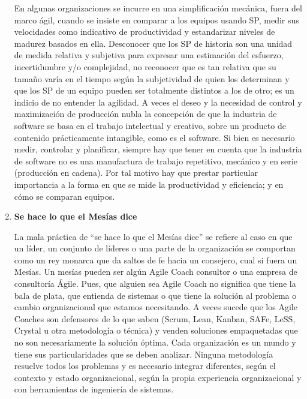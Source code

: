 \begin{enumerate}
En algunas organizaciones se incurre en una simplificación mecánica, fuera del marco ágil, cuando se insiste en comparar a los equipos usando SP, medir sus velocidades como indicativo de productividad y estandarizar niveles de madurez basados en ella. 
Desconocer que los SP de historia son una unidad de medida relativa y subjetiva para expresar una estimación del esfuerzo, incertidumbre y/o complejidad, no reconocer que es tan relativa que su tamaño varía en el tiempo según la subjetividad de quien los determinan y que los SP de un equipo pueden ser totalmente distintos a los de otro; es un indicio de no entender la agilidad. A veces el deseo y la necesidad de control y maximización de producción nubla la concepción de que la industria de software se basa en el trabajo intelectual y creativo, sobre un producto de contenido prácticamente intangible, como es el software. Si bien es necesario medir, controlar y planificar, siempre hay que tener en cuenta que la industria de software no es una manufactura de trabajo repetitivo, mecánico y en serie (producción en cadena). Por tal motivo hay que prestar particular importancia a la forma en que se mide la productividad y eficiencia; y en cómo se comparan equipos.

\item \textbf{Se hace lo que el Mesías dice}

La mala práctica de “se hace lo que el Mesías dice” se refiere al caso en que un líder, un conjunto de líderes o una parte de la organización se comportan como un rey monarca que da saltos de fe hacia un consejero, cual si fuera un Mesías. Un mesías pueden ser algún Agile Coach consultor o una empresa de consultoría Ágile. Pues, que alguien sea Agile Coach no significa que tiene la bala de plata, que entienda de sistemas o que tiene la solución al problema o cambio organizacional que estamos necesitando. A veces sucede que los Agile Coaches son defensores de lo que saben (Scrum, Lean, Kanban, SAFe, LeSS, Crystal u otra metodología o técnica) y venden soluciones empaquetadas que no son necesariamente la solución óptima. Cada organización es un mundo y tiene sus particularidades que se deben analizar. Ninguna metodología resuelve todos los problemas y es necesario integrar diferentes, según el contexto y estado organizacional, según la propia experiencia organizacional y con herramientas de ingeniería de sistemas.


\end{enumerate}
